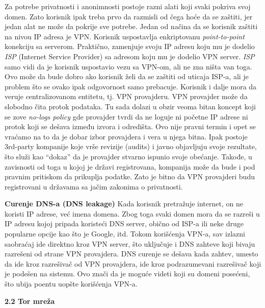\documentclass[
]{article}
\begin{document}
Za potrebe privatnosti i anonimnosti postoje razni alati koji svaki
pokriva svoj domen. Zato korisnik ipak treba prvo da razmisli od čega
hoće da se zaštiti, jer jedan alat ne može da pokrije sve potrebe. Jedan
od načina da se korisnik zaštiti na nivou IP adresa je VPN. Korisnik
uspostavlja enkriptovanu \emph{point-to-point} konekciju sa serverom.
Praktično, zamenjuje svoju IP adresu koju mu je dodelio \emph{ISP}
(Internet Service Provider) sa adresom koju mu je dodelio VPN server.
\emph{ISP} samo vidi da je korisnik uspostavio vezu sa VPN-om, ali ne
zna ništa van toga. Ovo može da bude dobro ako korisnik želi da se
zaštiti od uticaja ISP-a, ali je problem što se ovako ipak odgovornost
samo prebacuje. Korisnik i dalje mora da veruje centralizovanom
entitetu, tj. VPN provajderu. VPN provajder može da slobodno čita protok
podataka. Tu sada dolazi u obzir veoma bitan koncept koji se zove
\emph{no-logs policy} gde provajder tvrdi da ne loguje ni početne IP
adrese ni protok koji se dešava između izvora i odredišta. Ovo nije
pravni termin i opet se vraćamo na to da je dobar izbor provajdera i
vera u njega bitna. Ipak postoje 3rd-party kompanije koje vrše revizije
(audits) i javno objavljuju svoje rezultate, što služi kao ``dokaz'' da
je provajder stvarno ispunio svoje obećanje. Takođe, u zavisnosti od
toga u kojoj je državi registrovana, kompanija može da bude i pod
pravnim pritiskom da prikuplja podatke. Zato je bitno da VPN provajderi
budu registrovani u državama sa jačim zakonima o privatnosti.

\textbf{Curenje DNS-a (DNS leakage)} Kada korisnik pretražuje internet,
on ne koristi IP adrese, već imena domena. Zbog toga svaki domen mora da
se razreši u IP adresu kojoj pripada koristeći DNS server, obično od
ISP-a ili neke druge popularne opcije kao što je Google, itd. Tokom
korišćenja VPN-a, sav izlazni saobraćaj ide direktno kroz VPN server,
što uključuje i DNS zahteve koji bivaju razrešeni od strane VPN
provajdera. DNS curenje se dešava kada zahtev, umesto da ide kroz
razrešivač od VPN provajdera, ide kroz podrazumevani razrešivač koji je
podešen na sistemu. Ovo znači da je moguće videti koji su domeni
posećeni, što ubija poentu uopšte korišćenja VPN-a.

\protect\hypertarget{_Toc234141041}{}{}\textbf{2.2 Tor mreža}
\end{document}
